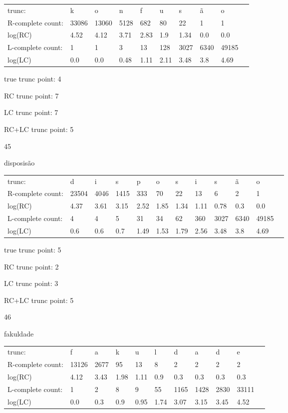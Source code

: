 \documentclass{article}
\begin{document}
\begin{tabular}{l|lllllllll}
trunc: & k & o & n & f & u & s & ã & o & \\ 
R-complete count: & 33086 & 13060 & 5128 & 682 & 80 & 22 & 1 & 1 & \\ 
log(RC) & 4.52 & 4.12 & 3.71 & 2.83 & 1.9 & 1.34 & 0.0 & 0.0 & \\ 
L-complete count: & 1 & 1 & 3 & 13 & 128 & 3027 & 6340 & 49185 & \\ 
log(LC) & 0.0 & 0.0 & 0.48 & 1.11 & 2.11 & 3.48 & 3.8 & 4.69 & \\ 
\end{tabular}

true trunc point: 4

RC trunc point: 7

LC trunc point: 7

RC+LC trunc point: 5

\newpage

45

disposisão

\begin{tabular}{l|lllllllllll}
trunc: & d & i & s & p & o & s & i & s & ã & o & \\ 
R-complete count: & 23504 & 4046 & 1415 & 333 & 70 & 22 & 13 & 6 & 2 & 1 & \\ 
log(RC) & 4.37 & 3.61 & 3.15 & 2.52 & 1.85 & 1.34 & 1.11 & 0.78 & 0.3 & 0.0 & \\ 
L-complete count: & 4 & 4 & 5 & 31 & 34 & 62 & 360 & 3027 & 6340 & 49185 & \\ 
log(LC) & 0.6 & 0.6 & 0.7 & 1.49 & 1.53 & 1.79 & 2.56 & 3.48 & 3.8 & 4.69 & \\ 
\end{tabular}

true trunc point: 5

RC trunc point: 2

LC trunc point: 3

RC+LC trunc point: 5

\vspace{1em}

46

fakuldade

\begin{tabular}{l|llllllllll}
trunc: & f & a & k & u & l & d & a & d & e & \\ 
R-complete count: & 13126 & 2677 & 95 & 13 & 8 & 2 & 2 & 2 & 2 & \\ 
log(RC) & 4.12 & 3.43 & 1.98 & 1.11 & 0.9 & 0.3 & 0.3 & 0.3 & 0.3 & \\ 
L-complete count: & 1 & 2 & 8 & 9 & 55 & 1165 & 1428 & 2830 & 33111 & \\ 
log(LC) & 0.0 & 0.3 & 0.9 & 0.95 & 1.74 & 3.07 & 3.15 & 3.45 & 4.52 & \\ 
\end{tabular}
\end{document}
